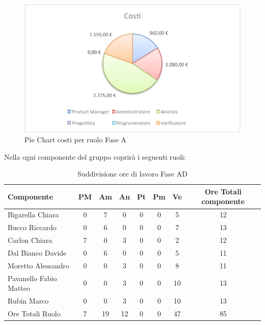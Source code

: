 				\begin{figure}[H]\centering
					\includegraphics[width=\textwidth]{PianoDiProgetto/Pics/ChartTotCostiFaseA.pdf}
					\caption{Pie Chart costi per ruolo Fase A}
				\end{figure}
				Nella  ogni componente del gruppo \groupname{} coprirà i seguenti ruoli:
				\begin{table}[H]
					\begin{center}
						\begin{tabular}{| l | c | c | c | c | c | c | c |}
							\hline
							Componente 				& PM	& Am 	& An 	& Pt 		& Pm 	& Ve 	& Ore Totali componente \\ \hline
							
							Bigarella Chiara 			& 0		& 7 		& 0		& 0		& 0		& 5 		& 12 \\
							Bucco Riccardo 			& 0		& 6 		& 0		& 0		& 0		& 7 		& 13 \\
							Carlon Chiara	 			& 7 		& 0		& 3 		& 0		& 0		& 2 		& 12 \\
							Dal Bianco Davide 			& 0		& 6 		& 0		& 0		& 0		& 5 		& 11 \\
							Moretto Alessandro 			& 0		& 0		& 3 		& 0		& 0		& 8 		& 11 \\
							Pavanello Fabio Matteo	 	& 0		& 0		& 3 		& 0		& 0		& 10 		& 13 \\
							Rubin Marco				& 0		& 0		& 3 		& 0		& 0		& 10 		& 13 \\ \hline \hline
							
							Ore Totali Ruolo 			& 7 		& 19 		& 12 		& 0		& 0		& 47 		& 85\\ \hline
						\end{tabular}
					\end{center}
					\caption{Suddivisione ore di lavoro Fase AD}
				\end{table}
